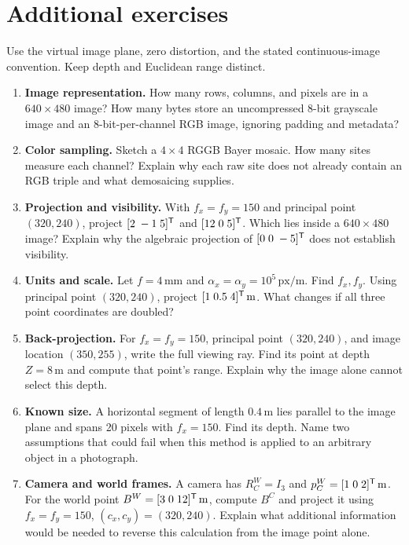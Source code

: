 \clearpage
\section{Additional exercises}
Use the virtual image plane, zero distortion, and the stated continuous-image
convention. Keep depth and Euclidean range distinct.
\begin{enumerate}
\item \textbf{Image representation.} How many rows, columns, and pixels are
in a $640\times480$ image? How many bytes store an uncompressed 8-bit grayscale
image and an 8-bit-per-channel RGB image, ignoring padding and metadata?

\item \textbf{Color sampling.} Sketch a $4\times4$ RGGB Bayer mosaic.
How many sites measure each channel? Explain why each raw site does not
already contain an RGB triple and what demosaicing supplies.

\item \textbf{Projection and visibility.} With $f_x=f_y=150$ and principal
point $(320,240)$, project $[2\;-1\;5]^{\mathsf T}$ and $[12\;0\;5]^{\mathsf T}$.
Which lies inside a $640\times480$ image? Explain why the algebraic projection
of $[0\;0\;-5]^{\mathsf T}$ does not establish visibility.

\item \textbf{Units and scale.} Let $f=4\,\mathrm{mm}$ and
$\alpha_x=\alpha_y=10^5\,\mathrm{px/m}$. Find $f_x,f_y$.
Using principal point $(320,240)$, project $[1\;0.5\;4]^{\mathsf T}\,\mathrm m$.
What changes if all three point coordinates are doubled?

\item \textbf{Back-projection.} For $f_x=f_y=150$, principal point $(320,240)$,
and image location $(350,255)$, write the full viewing ray.
Find its point at depth $Z=8\,\mathrm m$ and compute that point's range.
Explain why the image alone cannot select this depth.

\item \textbf{Known size.} A horizontal segment of length $0.4\,\mathrm m$
lies parallel to the image plane and spans 20 pixels with $f_x=150$.
Find its depth. Name two assumptions that could fail when this method is
applied to an arbitrary object in a photograph.

\item \textbf{Camera and world frames.} A camera has $R_C^W=I_3$ and
$p_C^W=[1\;0\;2]^{\mathsf T}\,\mathrm m$. For the world point
$B^W=[3\;0\;12]^{\mathsf T}\,\mathrm m$, compute $B^C$ and project it using
$f_x=f_y=150$, $(c_x,c_y)=(320,240)$. Explain what additional information
would be needed to reverse this calculation from the image point alone.
\end{enumerate}
